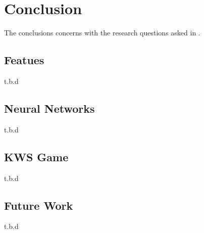 
\chapter{Conclusion}\label{sec:conclusion}
The conclusions concerns with the research questions asked in .



\section{Featues}
\thesisStateNotReady
t.b.d



\section{Neural Networks}
\thesisStateNotReady
t.b.d



\section{KWS Game}
\thesisStateNotReady
t.b.d



\section{Future Work}
\thesisStateNotReady
t.b.d